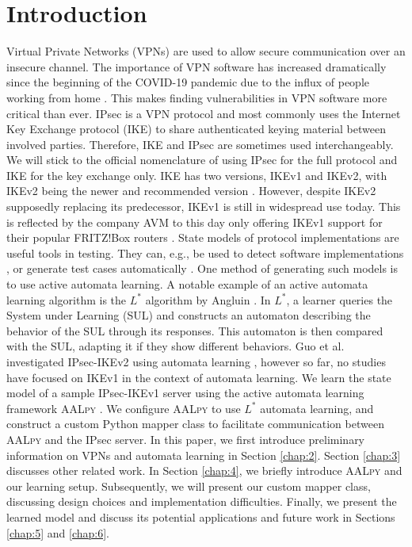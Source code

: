 \documentclass[runningheads]{llncs}
\begin{document}
\section{Introduction}
Virtual Private Networks (VPNs) are used to allow secure communication over an insecure channel. The importance of VPN software has increased dramatically since the beginning of the COVID-19 pandemic due to the influx of people working from home \cite{abhijith2020impact}. This makes finding vulnerabilities in VPN software more critical than ever. IPsec is a VPN protocol and most commonly uses the Internet Key Exchange protocol (IKE) to share authenticated keying material between involved parties. Therefore, IKE and IPsec are sometimes used interchangeably. We will stick to the official nomenclature of using IPsec for the full protocol and IKE for the key exchange only. IKE has two versions, IKEv1 and IKEv2, with IKEv2 being the newer and recommended version \cite{nist791491}. However, despite IKEv2 supposedly replacing its predecessor, IKEv1 is still in widespread use today. This is reflected by the company AVM to this day only offering IKEv1 support for their popular FRITZ!Box routers \cite{avm2022}.
State models of protocol implementations are useful tools in testing. They can, e.g., be used to detect software implementations \cite{pferscher2021fingerprinting}, or generate test cases automatically \cite{pferscher2022fuzzing}. One method of generating such models is to use active automata learning. A notable example of an active automata learning algorithm is the $L^*$ algorithm by Angluin \cite{angluin1987learning}. In $L^*$, a learner queries the System under Learning (SUL) and constructs an automaton describing the behavior of the SUL through its responses. This automaton is then compared with the SUL, adapting it if they show different behaviors. Guo et al.~\cite{guo2019model} investigated IPsec-IKEv2 using automata learning \cite{guo2019model}, however so far, no studies have focused on IKEv1 in the context of automata learning. 
We learn the state model of a sample IPsec-IKEv1 server using the active automata learning framework \textsc{AALpy} \cite{muvskardin2022AALpy}. We configure \textsc{AALpy} to use $L^*$ automata learning, and construct a custom Python mapper class to facilitate communication between \textsc{AALpy} and the IPsec server.
In this paper, we first introduce preliminary information on VPNs and automata learning in Section \ref{chap:2}. Section \ref{chap:3} discusses other related work. In Section \ref{chap:4}, we briefly introduce \textsc{AALpy} and our learning setup. Subsequently, we will present our custom mapper class, discussing design choices and implementation difficulties. Finally, we present the learned model and discuss its potential applications and future work in Sections \ref{chap:5} and \ref{chap:6}.
\end{document}

